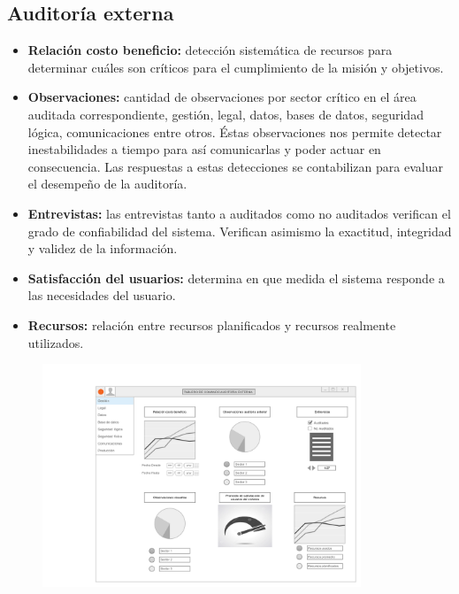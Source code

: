     \subsection{Auditoría externa}
    	\begin{itemize}
        	\item\textbf{Relación costo beneficio: }detección sistemática de recursos para determinar cuáles son críticos para el cumplimiento de la misión y objetivos.
            \item\textbf{Observaciones: } cantidad de observaciones por sector crítico en el área auditada correspondiente, gestión, legal, datos, bases de datos, seguridad lógica, comunicaciones entre otros. Éstas observaciones nos permite detectar inestabilidades a tiempo para así comunicarlas y poder actuar en consecuencia. Las respuestas a estas detecciones se contabilizan para evaluar el desempeño de la auditoría.
            \item\textbf{Entrevistas: } las entrevistas tanto a auditados como no auditados verifican el grado de confiabilidad del sistema. Verifican asimismo la exactitud, integridad y validez de la información.
			\item\textbf{Satisfacción del usuarios: } determina en que medida el sistema responde a las necesidades del usuario.
            \item\textbf{Recursos: } relación entre recursos planificados y recursos realmente utilizados.
		\end{itemize}    
    
    \begin{figure}[h]
	  \centering
  	  \includegraphics[width=0.85\textwidth]{img/tp2_integrador/auditoria_externa}
      \label{Auditoría externa}
	\end{figure}
    
